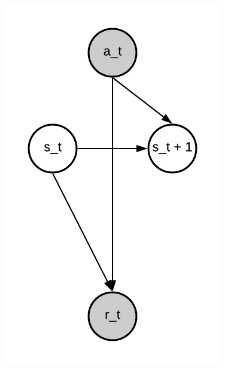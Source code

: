 \documentclass[12pt,titlepage,a4paper]{article}
\begin{document}
\begin{figure}[!htb]
      \includegraphics[width=\linewidth]{markov.png}
      \caption{}
      \label{Markov}
    \endminipage\hfill

\end{figure}
\end{document}
